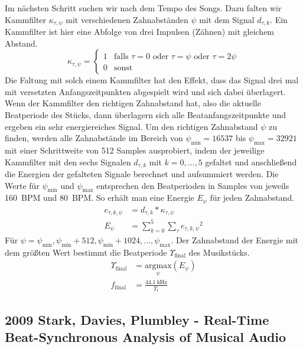 {{{			%
			Im nächsten Schritt suchen wir nach dem Tempo des Songs.
			Dazu falten wir Kammfilter $\kappa_{\tau, \psi}$ mit verschiedenen Zahnabständen $\psi$ mit dem Signal $d_{\tau, k}$.
			Ein Kammfilter ist hier eine Abfolge von drei Impulsen (Zähnen) mit gleichem Abstand.
			\begin{equation}
				\kappa_{\tau, \psi} =
					\begin{cases}
						1 & \text{falls } \tau = 0 \text{ oder } \tau = \psi \text{ oder } \tau = 2\psi \\
						0 & \text{sonst}
					\end{cases}
			\end{equation}
			Die Faltung mit solch einem Kammfilter hat den Effekt,
				dass das Signal drei mal mit versetzten Anfangszeitpunkten abgespielt wird
				und sich dabei überlagert.
			Wenn der Kammfilter den richtigen Zahnabstand hat,
				also die aktuelle Beatperiode des Stücks,
				dann überlagern sich alle Beatanfangszeitpunkte
				und ergeben ein sehr energiereiches Signal.
			Um den richtigen Zahnabstand $\psi$ zu finden,
				werden alle Zahnabstände im Bereich von $\psi_\text{min} = \num{16537}$ bis $\psi_\text{max} = \num{32921}$
				mit einer Schrittweite von \num{512} Samples ausprobiert,
				indem der jeweilige Kammfilter mit den sechs Signalen $d_{\tau, k}$ mit $k = 0, ..., 5$ gefaltet
				und anschlie{\ss}end die Energien der gefalteten Signale berechnet und aufsummiert werden.
			Die Werte für $\psi_\text{min}$ und $\psi_\text{max}$ entsprechen den Beatperioden in Samples von jeweils \SI{160}{BPM} und \SI{80}{BPM}.
			So erhält man eine Energie $E_\psi$ für jeden Zahnabstand.
			\begin{align}
				e_{\tau, k, \psi} &= d_{\tau, k} * \kappa_{\tau, \psi} \\
				E_\psi &= \sum_{k = 0}^5 \sum_\tau {e_{\tau, k, \psi}}^2
			\end{align}
			Für $\psi = \psi_\text{min}, \psi_\text{min} + 512, \psi_\text{min} + 1024, ..., \psi_\text{max}$.
			Der Zahnabstand der Energie mit dem grö{\ss}ten Wert bestimmt die Beatperiode $\Upsilon_\text{final}$ des Musikstücks.
			\begin{align}
				\Upsilon_\text{final} &= \underset{\psi}{\text{argmax}}(E_\psi) \\
				f_\text{final} &= \frac{\SI{44.1}{\kilo\hertz}}{\Upsilon_\text{f}}
			\end{align}
		}
	}

	\subsection{2009 Stark, Davies, Plumbley - Real-Time Beat-Synchronous Analysis of Musical Audio}
	{
}}
